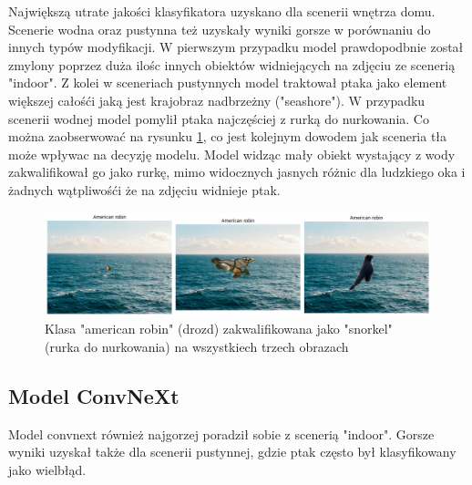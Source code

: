 Największą utrate jakości klasyfikatora uzyskano dla scenerii wnętrza domu. Scenerie wodna oraz pustynna też uzyskały wyniki gorsze w porównaniu do innych typów modyfikacji. W pierwszym przypadku model prawdopodbnie został zmylony poprzez
duża ilośc innych obiektów widniejących na zdjęciu ze scenerią "indoor". Z kolei w sceneriach pustynnych model traktował ptaka jako element większej całośći jaką jest krajobraz nadbrzeżny ("seashore"). W przypadku scenerii wodnej model
pomylił ptaka najczęściej z rurką do nurkowania. Co można zaobserwować na rysunku \ref*{rys:15}, co jest kolejnym dowodem jak sceneria tła może wpływac na decyzję modelu. Model widząc mały obiekt wystający z wody zakwalifikował go jako rurkę,
mimo widocznych jasnych różnic dla ludzkiego oka i żadnych wątpliwośći że na zdjęciu widnieje ptak.

\begin{figure}
	\centering\includegraphics[width=.9\textwidth]{img/15}
	\caption{Klasa "american robin" (drozd) zakwalifikowana jako "snorkel" (rurka do nurkowania) na wszystkiech trzech obrazach}
	\label{rys:15}
\end{figure}

\subsection*{Model ConvNeXt}

Model convnext również najgorzej poradził sobie z scenerią "indoor". Gorsze wyniki uzyskał także dla scenerii pustynnej, gdzie ptak często był klasyfikowany jako wielbłąd. 


